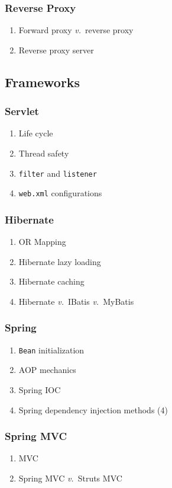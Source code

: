 \documentclass[11pt, twocolumn]{article}
\newcommand{\versus}{\textit{v.}\ }
\begin{document}
\subsubsection{Reverse Proxy}
\begin{enumerate}
	\item Forward proxy \versus reverse proxy
	\item Reverse proxy server
\end{enumerate}

\subsection{Frameworks}

\subsubsection{Servlet}
\begin{enumerate}
	\item Life cycle
	\item Thread safety
	\item \texttt{filter} and \texttt{listener}
	\item \texttt{web.xml} configurations
\end{enumerate}

\subsubsection{Hibernate}
\begin{enumerate}
	\item OR Mapping
	\item Hibernate lazy loading
	\item Hibernate caching
	\item Hibernate \versus IBatis \versus MyBatis
\end{enumerate}

\subsubsection{Spring}
\begin{enumerate}
	\item \texttt{Bean} initialization
	\item AOP mechanics
	\item Spring IOC
	\item Spring dependency injection methods (4)
\end{enumerate}

\subsubsection{Spring MVC}
\begin{enumerate}
	\item MVC
	\item Spring MVC \versus Struts MVC
\end{enumerate}
\end{document}

